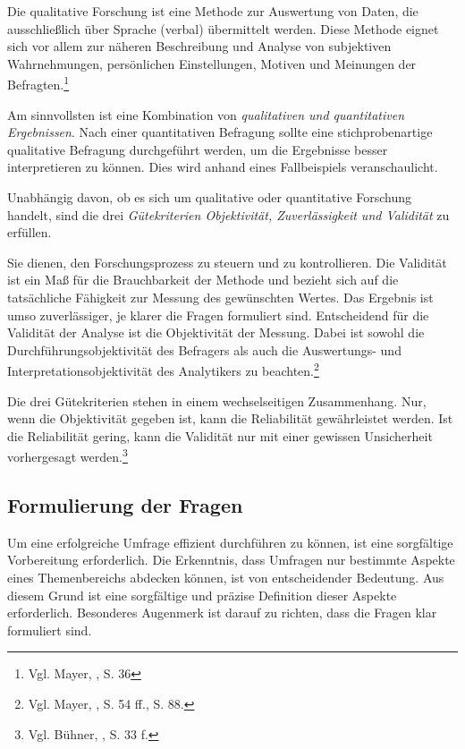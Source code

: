 Die qualitative Forschung ist eine Methode zur Auswertung von Daten, die ausschließlich über Sprache (verbal) übermittelt
werden. Diese Methode eignet sich vor allem zur näheren Beschreibung und Analyse von subjektiven Wahrnehmungen, persönlichen
Einstellungen, Motiven und Meinungen der Befragten.\footnote{Vgl. Mayer, \cite{Interview und schriftliche Befragung}, S. 36}

Am sinnvollsten ist eine Kombination von \textit{qualitativen und quantitativen Ergebnissen}. Nach einer quantitativen
Befragung sollte eine stichprobenartige qualitative Befragung durchgeführt werden, um die Ergebnisse besser interpretieren
zu können. Dies wird anhand eines Fallbeispiels veranschaulicht.

Unabhängig davon, ob es sich um qualitative oder quantitative Forschung handelt, sind die drei \textit{Gütekriterien
Objektivität, Zuverlässigkeit und Validität} zu erfüllen.

Sie dienen, den Forschungsprozess zu steuern und zu kontrollieren. Die Validität ist ein Maß für die Brauchbarkeit der
Methode und bezieht sich auf die tatsächliche Fähigkeit zur Messung des gewünschten Wertes. Das Ergebnis ist umso zuverlässiger,
je klarer die Fragen formuliert sind. Entscheidend für die Validität der Analyse ist die Objektivität der Messung. Dabei
ist sowohl die Durchführungsobjektivität des Befragers als auch die Auswertungs- und Interpretationsobjektivität des
Analytikers zu beachten.\footnote{Vgl. Mayer, \cite{Interview und schriftliche Befragung}, S. 54 ff., S. 88.}

Die drei Gütekriterien stehen in einem wechselseitigen Zusammenhang. Nur, wenn die Objektivität gegeben ist, kann die
Reliabilität gewährleistet werden. Ist die Reliabilität gering, kann die Validität nur mit einer gewissen Unsicherheit
vorhergesagt werden.\footnote{Vgl. Bühner, \cite{Einfuehrung in die Test- und Fragebogenkonstruktion}, S. 33 f.}

\subsection{Formulierung der Fragen}
Um eine erfolgreiche Umfrage effizient durchführen zu können, ist eine sorgfältige Vorbereitung erforderlich. Die
Erkenntnis, dass Umfragen nur bestimmte Aspekte eines Themenbereichs abdecken können, ist von entscheidender Bedeutung.
Aus diesem Grund ist eine sorgfältige und präzise Definition dieser Aspekte erforderlich. Besonderes Augenmerk ist darauf
zu richten, dass die Fragen klar formuliert sind.

